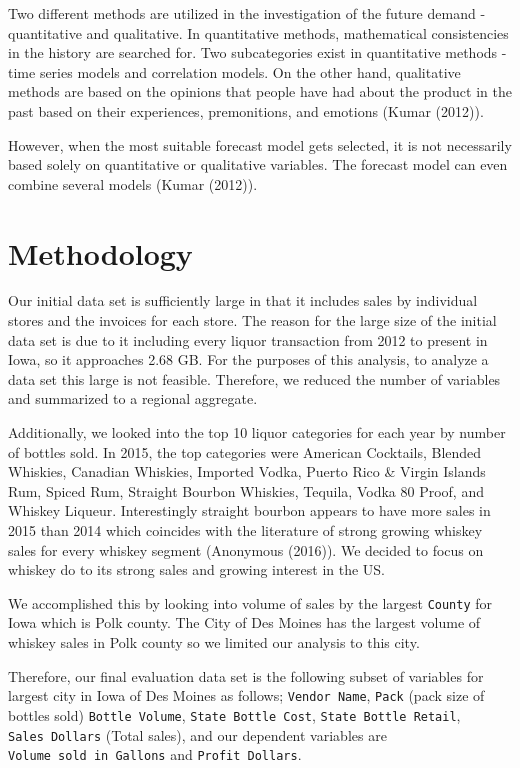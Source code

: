 \documentclass[]{elsarticle} %
\begin{document}
Two different methods are utilized in the investigation of the future
demand - quantitative and qualitative. In quantitative methods,
mathematical consistencies in the history are searched for. Two
subcategories exist in quantitative methods - time series models and
correlation models. On the other hand, qualitative methods are based on
the opinions that people have had about the product in the past based on
their experiences, premonitions, and emotions (Kumar (2012)).

However, when the most suitable forecast model gets selected, it is not
necessarily based solely on quantitative or qualitative variables. The
forecast model can even combine several models (Kumar (2012)).

\section{Methodology}\label{methodology}

Our initial data set is sufficiently large in that it includes sales by
individual stores and the invoices for each store. The reason for the
large size of the initial data set is due to it including every liquor
transaction from 2012 to present in Iowa, so it approaches 2.68 GB. For
the purposes of this analysis, to analyze a data set this large is not
feasible. Therefore, we reduced the number of variables and summarized
to a regional aggregate.

Additionally, we looked into the top 10 liquor categories for each year
by number of bottles sold. In 2015, the top categories were American
Cocktails, Blended Whiskies, Canadian Whiskies, Imported Vodka, Puerto
Rico \& Virgin Islands Rum, Spiced Rum, Straight Bourbon Whiskies,
Tequila, Vodka 80 Proof, and Whiskey Liqueur. Interestingly straight
bourbon appears to have more sales in 2015 than 2014 which coincides
with the literature of strong growing whiskey sales for every whiskey
segment (Anonymous (2016)). We decided to focus on whiskey do to its
strong sales and growing interest in the US.

We accomplished this by looking into volume of sales by the largest
\texttt{County} for Iowa which is Polk county. The City of Des Moines
has the largest volume of whiskey sales in Polk county so we limited our
analysis to this city.

Therefore, our final evaluation data set is the following subset of
variables for largest city in Iowa of Des Moines as follows;
\texttt{Vendor\ Name}, \texttt{Pack} (pack size of bottles sold)
\texttt{Bottle\ Volume}, \texttt{State\ Bottle\ Cost},
\texttt{State\ Bottle\ Retail}, \texttt{Sales\ Dollars} (Total sales),
and our dependent variables are \texttt{Volume\ sold\ in\ Gallons} and
\texttt{Profit\ Dollars}.
\end{document}
